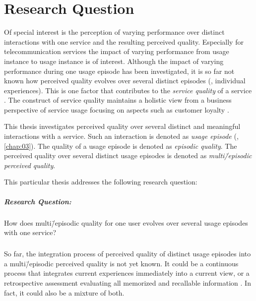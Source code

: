 \section{Research Question}
Of special interest is the perception of varying performance over distinct interactions with one service and the resulting perceived quality.
Especially for telecommunication services the impact of varying performance from usage instance to usage instance is of interest.
Although the impact of varying performance during one usage episode has been investigated, it is so far not known how perceived quality evolves over several distinct episodes (\ie, individual experiences).
This is one factor that contributes to the \emph{service quality} of a service \citep[][]{berry_quality_1985, zeithaml_behavioral_1996}.
The construct of service quality maintains a holistic view from a business perspective of service usage focusing on aspects such as customer loyalty \citep{parasuraman_conceptual_1985}.

This thesis investigates perceived quality over several distinct and meaningful interactions with a service.
Such an interaction is denoted as \emph{usage episode} (\cf, \autoref{chap:03}).
The quality of a usage episode is denoted as \emph{episodic quality}.
The perceived quality over several distinct usage episodes is denoted as \emph{multi\=/episodic perceived quality}.

This particular thesis addresses the following research question: 
\subparagraph*{Research Question:}
How does multi\=/episodic quality for one user evolves over several usage episodes with one service?

\subparagraph*{}
So far, the integration process of perceived quality of distinct usage episodes into a multi\=/episodic perceived quality is not yet known.
It could be a continuous process that integrates current experiences immediately into a current view, or a retrospective assessment evaluating all memorized and recallable information \citep[][]{hogarth_order_1992}. 
In fact, it could also be a mixture of both.

